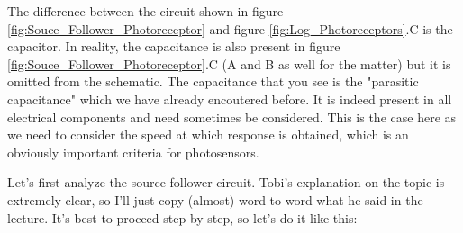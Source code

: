 The difference between the circuit shown in figure \ref{fig:Souce_Follower_Photoreceptor} and  figure \ref{fig:Log_Photoreceptors}.C is the capacitor. In reality, the capacitance is also present in figure \ref{fig:Souce_Follower_Photoreceptor}.C (A and B as well for the matter) but it is omitted from the schematic. The capacitance that you see is the "parasitic capacitance" which we have already encoutered before. It is indeed present in all electrical components and need sometimes be considered. This is the case here as we need to consider the speed at which response is obtained, which is an obviously important criteria for photosensors. 

Let's first analyze the source follower circuit. Tobi's explanation on the topic is extremely clear, so I'll just copy (almost) word to word what he said in the lecture. It's best to proceed step by step, so let's do it like this: 

